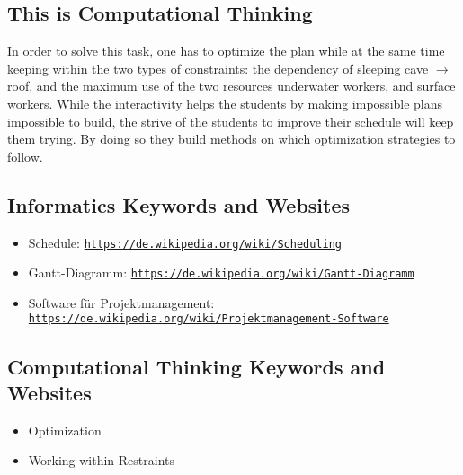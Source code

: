 \documentclass[a4paper,11pt]{report}
\newcommand{\BrochureUrlText}[1]{\texttt{#1}}
\begin{document}
\subsection*{This is Computational Thinking}

In order to solve this task, one has to optimize the plan while at the same time keeping within the two types of constraints: the dependency of sleeping cave \ensuremath{\rightarrow} roof, and the maximum use of the two resources underwater workers, and surface workers. While the interactivity helps the students by making impossible plans impossible to build, the strive of the students to improve their schedule will keep them trying. By doing so they build methods on which optimization strategies to follow.


\subsection*{Informatics Keywords and Websites}

\begin{itemize}
  \item Schedule: \href{https://de.wikipedia.org/wiki/Scheduling}{\BrochureUrlText{https://de.wikipedia.org/wiki/Scheduling}}
  \item Gantt-Diagramm: \href{https://de.wikipedia.org/wiki/Gantt-Diagramm}{\BrochureUrlText{https://de.wikipedia.org/wiki/Gantt-Diagramm}}
  \item Software für Projektmanagement: \href{https://de.wikipedia.org/wiki/Projektmanagement-Software}{\BrochureUrlText{https://de.wikipedia.org/wiki/Projektmanagement-Software}}
\end{itemize}


\subsection*{Computational Thinking Keywords and Websites}

\begin{itemize}
  \item Optimization
  \item Working within Restraints
\end{itemize}
\end{document}
